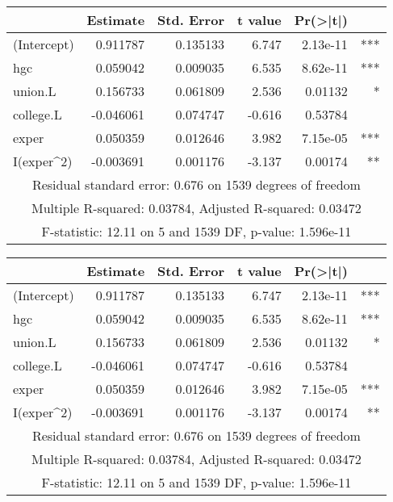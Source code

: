 \documentclass{article}
\begin{document}
\begin{table}
\begin{tabular}{lrrrrr}
\hline
& Estimate & Std. Error & t value & Pr(\textgreater|t|) & \\
\hline
(Intercept) & 0.911787 & 0.135133 & 6.747 & 2.13e-11 & *** \\
hgc & 0.059042 & 0.009035 & 6.535 & 8.62e-11 & *** \\
union.L & 0.156733 & 0.061809 & 2.536 & 0.01132 & * \\
college.L & -0.046061 & 0.074747 & -0.616 & 0.53784 & \\
exper & 0.050359 & 0.012646 & 3.982 & 7.15e-05 & *** \\
I(exper\textasciicircum 2) & -0.003691 & 0.001176 & -3.137 & 0.00174 & ** \\
\hline
\multicolumn{6}{c}{Residual standard error: 0.676 on 1539 degrees of freedom}\\
\multicolumn{6}{c}{Multiple R-squared: 0.03784, Adjusted R-squared: 0.03472}\\
\multicolumn{6}{c}{F-statistic: 12.11 on 5 and 1539 DF, p-value: 1.596e-11}\\
\hline
\end{tabular}
\begin{tabular}{lrrrrr}
\hline
& Estimate & Std. Error & t value & Pr(\textgreater|t|) & \\
\hline
(Intercept) & 0.911787 & 0.135133 & 6.747 & 2.13e-11 & *** \\
hgc & 0.059042 & 0.009035 & 6.535 & 8.62e-11 & *** \\
union.L & 0.156733 & 0.061809 & 2.536 & 0.01132 & * \\
college.L & -0.046061 & 0.074747 & -0.616 & 0.53784 & \\
exper & 0.050359 & 0.012646 & 3.982 & 7.15e-05 & *** \\
I(exper\textasciicircum 2) & -0.003691 & 0.001176 & -3.137 & 0.00174 & ** \\
\hline
\multicolumn{6}{c}{Residual standard error: 0.676 on 1539 degrees of freedom}\\
\multicolumn{6}{c}{Multiple R-squared: 0.03784, Adjusted R-squared: 0.03472}\\
\multicolumn{6}{c}{F-statistic: 12.11 on 5 and 1539 DF, p-value: 1.596e-11}\\
\hline
\end{tabular}




\end{table}
\end{document}
